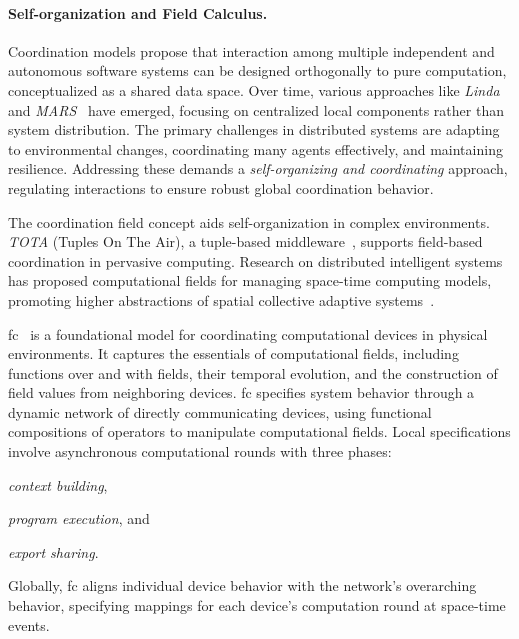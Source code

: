 \documentclass[12pt, a4paper]{article}
\newenvironment{inlinelist}{\begin{enumerate*}[label=\emph{(\roman*)}]}{\end{enumerate*}}
\begin{document}
\sloppypar
\paragraph{Self-organization and Field Calculus.}

Coordination models propose that interaction among multiple independent and autonomous software systems can be designed
orthogonally to pure computation, conceptualized as a shared data space.
%
Over time,
various approaches like \textit{Linda}~\cite{ViroliCoordination2012} and \textit{MARS}~\cite{mars} have emerged,
focusing on centralized local components rather than system distribution.
%
The primary challenges in distributed systems are adapting to environmental changes, coordinating many agents effectively, and maintaining resilience.
%
Addressing these demands a \emph{self-organizing and coordinating} approach, regulating interactions to ensure robust global coordination behavior.




The coordination field concept aids self-organization in complex environments.
\emph{TOTA} (Tuples On The Air), a tuple-based middleware~\cite{tota}, 
supports field-based coordination in pervasive computing. 
%
Research on distributed intelligent systems has proposed computational fields for managing space-time computing models, 
promoting higher abstractions of spatial collective adaptive systems~\cite{JLAMP2019}.

\ac{fc}~\cite{TOCL2019} is a foundational model for coordinating computational devices in physical environments.
%
It captures the essentials of computational fields,
including functions over and with fields,
their temporal evolution,
and the construction of field values from neighboring devices.
%
\ac{fc} specifies system behavior through a dynamic network of directly communicating devices,
using functional compositions of operators to manipulate computational fields.
%
Local specifications involve asynchronous computational rounds with three phases:
\begin{inlinelist}
    \item \emph{context building},
    \item \emph{program execution}, and
    \item \emph{export sharing}.
\end{inlinelist}
%
Globally,
\ac{fc} aligns individual device behavior with the network's overarching behavior,
specifying mappings for each device's computation round at space-time events.
\end{document}

